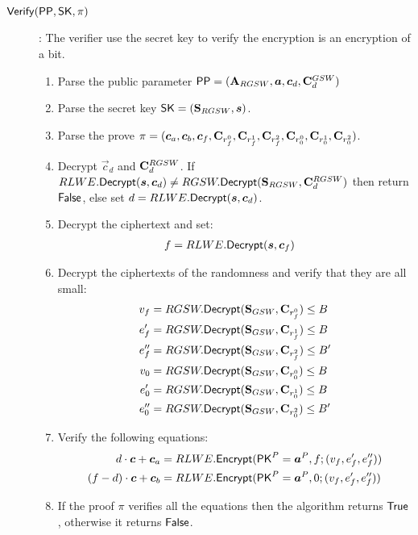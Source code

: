\begin{description}
\item[${\mathsf{Verify}}({\mathsf{PP}}, \mathsf{SK}, \pi)$]: The verifier use the secret key to verify the encryption is an encryption of a bit.
  \begin{enumerate}
  \item Parse the public parameter $\PPP = (\mat{A}_{RGSW}, \vec{a}, \vec{c}_d, \mat{C}_d^{GSW})$
  \item Parse the secret key $\SK = (\mat{S}_{RGSW}, \vec{s})$.
  \item Parse the prove $\pi = (\vec{c}_a, \vec{c}_b, \vec{c}_f, \mat{C}_{r_f^0}, \mat{C}_{r_f^1}, \mat{C}_{r_f^2}, \mat{C}_{r_0^0}, \mat{C}_{r_0^1}, \mat{C}_{r_0^2})$.
  \item Decrypt $\vec{c}_d$ and $\mathbf{C}_d^{RGSW}$.
    If $RLWE.\Dec(\vec{s}, \vec{c}_d) \neq RGSW.\Dec(\mat{S}_{RGSW}, \mat{C}_d^{RGSW})$ then return $\mathsf{False}$, else set $d = RLWE.\Dec(\vec{s}, \vec{c}_d)$.
  \item Decrypt the ciphertext and set:
    \begin{align*}
      f &= RLWE.\Dec(\vec{s}, \vec{c}_f)
    \end{align*}
  \item Decrypt the ciphertexts of the randomness and verify that they are all small:
    \begin{align*}
      v_f & = RGSW.{\mathsf{Decrypt}}(\mathbf{S}_{GSW}, \mathbf{C}_{r_f^0}) \leq B \\
      e_f' & = RGSW.{\mathsf{Decrypt}}(\mathbf{S}_{GSW}, \mathbf{C}_{r_f^1}) \leq B \\
      e_f'' & = RGSW.{\mathsf{Decrypt}}(\mathbf{S}_{GSW}, \mathbf{C}_{r_f^2}) \leq B' \\
      v_0 & = RGSW.{\mathsf{Decrypt}}(\mathbf{S}_{GSW}, \mathbf{C}_{r_0^0}) \leq B \\
      e_0' & = RGSW.{\mathsf{Decrypt}}(\mathbf{S}_{GSW}, \mathbf{C}_{r_0^1}) \leq B \\
      e_0'' & = RGSW.{\mathsf{Decrypt}}(\mathbf{S}_{GSW}, \mathbf{C}_{r_0^2}) \leq B' \\
    \end{align*}
  \item Verify the following equations:
    \begin{align*}
      d \cdot \vec{c} + \vec{c}_a &= RLWE.\Enc(\PK^P = \vec{a}^P, f; (v_f, e_f', e_f''))\\
      (f-d) \cdot \vec{c} + \vec{c}_b &= RLWE.\Enc(\PK^P= \vec{a}^P, 0; (v_f, e_f', e_f''))
    \end{align*}
  \item If the proof $\pi$ verifies all the equations then the algorithm returns $\mathsf{True}$, otherwise it returns $\mathsf{False}$.
  \end{enumerate}
  
  
  
\end{description}
